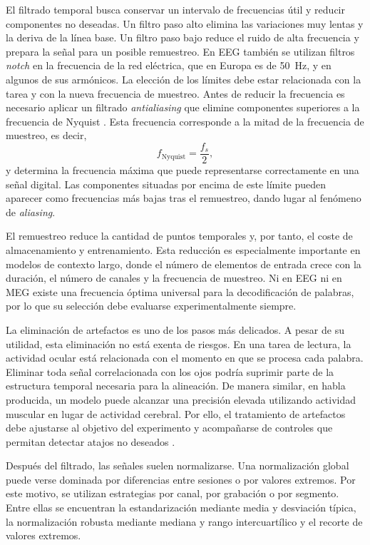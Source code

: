 El filtrado temporal busca conservar un intervalo de frecuencias útil y reducir componentes no deseadas. Un filtro paso alto elimina las variaciones muy lentas y la deriva de la línea base. Un filtro paso bajo reduce el ruido de alta frecuencia y prepara la señal para un posible remuestreo. En EEG también se utilizan filtros \textit{notch} en la frecuencia de la red eléctrica, que en Europa es de 50~Hz, y en algunos de sus armónicos. La elección de los límites debe estar relacionada con la tarea y con la nueva frecuencia de muestreo. Antes de reducir la frecuencia es necesario aplicar un filtrado \textit{antialiasing} que elimine componentes superiores a la frecuencia de Nyquist \cite{widmann2015filter}. Esta frecuencia corresponde a la mitad de la frecuencia de muestreo, es decir,
\[
f_{\mathrm{Nyquist}} = \frac{f_s}{2},
\]
y determina la frecuencia máxima que puede representarse correctamente en una señal digital. Las componentes situadas por encima de este límite pueden aparecer como frecuencias más bajas tras el remuestreo, dando lugar al fenómeno de \textit{aliasing}.

El remuestreo reduce la cantidad de puntos temporales y, por tanto, el coste de almacenamiento y entrenamiento. Esta reducción es especialmente importante en modelos de contexto largo, donde el número de elementos de entrada crece con la duración, el número de canales y la frecuencia de muestreo. Ni en EEG ni en MEG existe una frecuencia óptima universal para la decodificación de palabras, por lo que su selección debe evaluarse experimentalmente siempre.

La eliminación de artefactos es uno de los pasos más delicados. A pesar de su utilidad, esta eliminación no está exenta de riesgos. En una tarea de lectura, la actividad ocular está relacionada con el momento en que se procesa cada palabra. Eliminar toda señal correlacionada con los ojos podría suprimir parte de la estructura temporal necesaria para la alineación. De manera similar, en habla producida, un modelo puede alcanzar una precisión elevada utilizando actividad muscular en lugar de actividad cerebral. Por ello, el tratamiento de artefactos debe ajustarse al objetivo del experimento y acompañarse de controles que permitan detectar atajos no deseados \cite{harris2021nonsense}.

Después del filtrado, las señales suelen normalizarse. Una normalización global puede verse dominada por diferencias entre sesiones o por valores extremos. Por este motivo, se utilizan estrategias por canal, por grabación o por segmento. Entre ellas se encuentran la estandarización mediante media y desviación típica, la normalización robusta mediante mediana y rango intercuartílico y el recorte de valores extremos.

